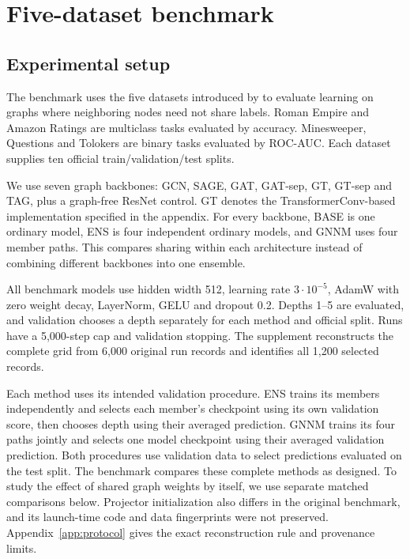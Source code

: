 \documentclass{article}
\begin{document}
\section{Five-dataset benchmark}\label{sec:original-benchmark}
\subsection{Experimental setup}
The benchmark uses the five datasets introduced by \citet{platonov2023critical} to evaluate learning on graphs where neighboring nodes need not share labels. Roman Empire and Amazon Ratings are multiclass tasks evaluated by accuracy. Minesweeper, Questions and Tolokers are binary tasks evaluated by ROC-AUC. Each dataset supplies ten official train/validation/test splits.

We use seven graph backbones: GCN, SAGE, GAT, GAT-sep, GT, GT-sep and TAG, plus a graph-free ResNet control. GT denotes the TransformerConv-based implementation specified in the appendix. For every backbone, BASE is one ordinary model, ENS is four independent ordinary models, and GNNM uses four member paths. This compares sharing within each architecture instead of combining different backbones into one ensemble.

All benchmark models use hidden width 512, learning rate $3\cdot10^{-5}$, AdamW with zero weight decay, LayerNorm, GELU and dropout 0.2. Depths 1--5 are evaluated, and validation chooses a depth separately for each method and official split. Runs have a 5,000-step cap and validation stopping. The supplement reconstructs the complete grid from 6,000 original run records and identifies all 1,200 selected records.

Each method uses its intended validation procedure. ENS trains its members independently and selects each member's checkpoint using its own validation score, then chooses depth using their averaged prediction. GNNM trains its four paths jointly and selects one model checkpoint using their averaged validation prediction. Both procedures use validation data to select predictions evaluated on the test split. The benchmark compares these complete methods as designed. To study the effect of shared graph weights by itself, we use separate matched comparisons below. Projector initialization also differs in the original benchmark, and its launch-time code and data fingerprints were not preserved. Appendix~\ref{app:protocol} gives the exact reconstruction rule and provenance limits.
\end{document}
